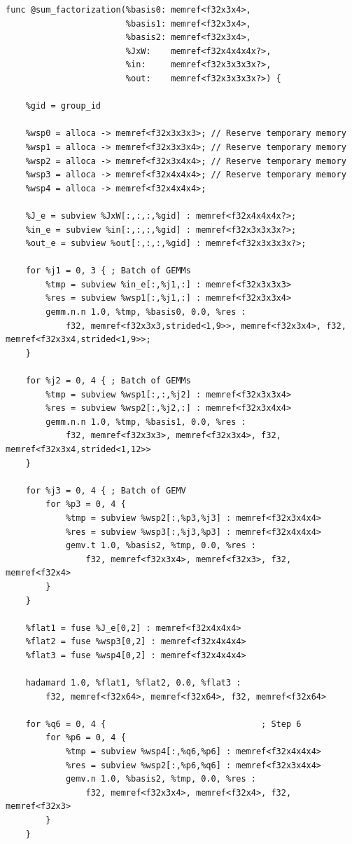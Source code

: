 \documentclass[a4paper,12pt]{article}
\begin{document}
\begin{lstlisting}[language=TensorIR,caption={BK1 using Tensor IR},basicstyle=\ttfamily\tiny,
                   label={lst:tinytc}]
func @sum_factorization(%basis0: memref<f32x3x4>,
                        %basis1: memref<f32x3x4>,
                        %basis2: memref<f32x3x4>,
                        %JxW:    memref<f32x4x4x4x?>,
                        %in:     memref<f32x3x3x3x?>,
                        %out:    memref<f32x3x3x3x?>) {

    %gid = group_id

    %wsp0 = alloca -> memref<f32x3x3x3>; // Reserve temporary memory
    %wsp1 = alloca -> memref<f32x3x3x4>; // Reserve temporary memory
    %wsp2 = alloca -> memref<f32x3x4x4>; // Reserve temporary memory
    %wsp3 = alloca -> memref<f32x4x4x4>; // Reserve temporary memory
    %wsp4 = alloca -> memref<f32x4x4x4>;

    %J_e = subview %JxW[:,:,:,%gid] : memref<f32x4x4x4x?>;
    %in_e = subview %in[:,:,:,%gid] : memref<f32x3x3x3x?>;
    %out_e = subview %out[:,:,:,%gid] : memref<f32x3x3x3x?>;

    for %j1 = 0, 3 { ; Batch of GEMMs
        %tmp = subview %in_e[:,%j1,:] : memref<f32x3x3x3>
        %res = subview %wsp1[:,%j1,:] : memref<f32x3x3x4>
        gemm.n.n 1.0, %tmp, %basis0, 0.0, %res :
            f32, memref<f32x3x3,strided<1,9>>, memref<f32x3x4>, f32, memref<f32x3x4,strided<1,9>>;
    }

    for %j2 = 0, 4 { ; Batch of GEMMs
        %tmp = subview %wsp1[:,:,%j2] : memref<f32x3x3x4>
        %res = subview %wsp2[:,%j2,:] : memref<f32x3x4x4>
        gemm.n.n 1.0, %tmp, %basis1, 0.0, %res :
            f32, memref<f32x3x3>, memref<f32x3x4>, f32, memref<f32x3x4,strided<1,12>>
    }

    for %j3 = 0, 4 { ; Batch of GEMV
        for %p3 = 0, 4 {
            %tmp = subview %wsp2[:,%p3,%j3] : memref<f32x3x4x4>
            %res = subview %wsp3[:,%j3,%p3] : memref<f32x4x4x4>
            gemv.t 1.0, %basis2, %tmp, 0.0, %res :
                f32, memref<f32x3x4>, memref<f32x3>, f32, memref<f32x4> 
        }
    }    

    %flat1 = fuse %J_e[0,2] : memref<f32x4x4x4>
    %flat2 = fuse %wsp3[0,2] : memref<f32x4x4x4>
    %flat3 = fuse %wsp4[0,2] : memref<f32x4x4x4>

    hadamard 1.0, %flat1, %flat2, 0.0, %flat3 :
        f32, memref<f32x64>, memref<f32x64>, f32, memref<f32x64>

    for %q6 = 0, 4 {                               ; Step 6
        for %p6 = 0, 4 {
            %tmp = subview %wsp4[:,%q6,%p6] : memref<f32x4x4x4>
            %res = subview %wsp2[:,%p6,%q6] : memref<f32x3x4x4>
            gemv.n 1.0, %basis2, %tmp, 0.0, %res :
                f32, memref<f32x3x4>, memref<f32x4>, f32, memref<f32x3> 
        }
    }


\end{lstlisting}
\end{document}
